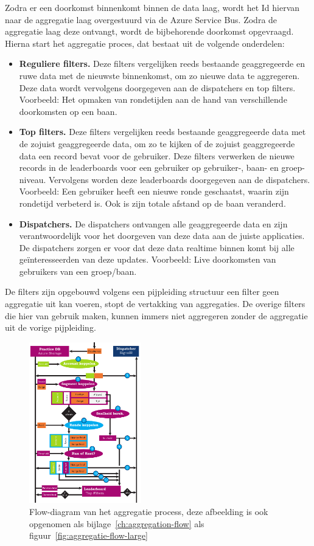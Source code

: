 Zodra er een doorkomst binnenkomt binnen de data laag, wordt het Id hiervan naar de aggregatie laag overgestuurd via de Azure Service Bus. Zodra de aggregatie laag deze ontvangt, wordt de bijbehorende doorkomst opgevraagd. Hierna start het aggregatie proces, dat bestaat uit de volgende onderdelen:

\begin{itemize}
\item \textbf{Reguliere filters.}
Deze filters vergelijken reeds bestaande geaggregeerde en ruwe data met de nieuwste binnenkomst, om zo nieuwe data te aggregeren. Deze data wordt vervolgens doorgegeven aan de dispatchers en top filters. Voorbeeld: Het opmaken van rondetijden aan de hand van verschillende doorkomsten op een baan.
\item \textbf{Top filters.}
Deze filters vergelijken reeds bestaande geaggregeerde data met de zojuist geaggregeerde data, om zo te kijken of de zojuist geaggregeerde data een record bevat voor de gebruiker. Deze filters verwerken de nieuwe records in de leaderboards voor een gebruiker op gebruiker-, baan- en groep-niveau. Vervolgens worden deze leaderboards doorgegeven aan de dispatchers. Voorbeeld: Een gebruiker heeft een nieuwe ronde geschaatst, waarin zijn rondetijd verbeterd is. Ook is zijn totale afstand op de baan veranderd. 
\item \textbf{Dispatchers.}
De dispatchers ontvangen alle geaggregeerde data en zijn verantwoordelijk voor het doorgeven van deze data aan de juiste applicaties. De dispatchers zorgen er voor dat deze data realtime binnen komt bij alle geïnteresseerden van deze updates. 
Voorbeeld: Live doorkomsten van gebruikers van een groep/baan. 
\end{itemize}

De filters zijn opgebouwd volgens een pijpleiding structuur een filter geen aggregatie uit kan voeren, stopt de vertakking van aggregaties. De overige filters die hier van gebruik maken, kunnen immers niet aggregeren zonder de aggregatie uit de vorige pijpleiding.

\begin{figure}[ht]
  \begin{center}
    \includegraphics[height=7cm]{style/images/Aggregatie-flow}
  \end{center}
  \caption{Flow-diagram van het aggregatie process, deze afbeelding is ook opgenomen als bijlage~\ref{ch:aggregation-flow} als figuur~\ref{fig:aggregatie-flow-large}}
  \label{fig:aggregatie-flow}
\end{figure}

